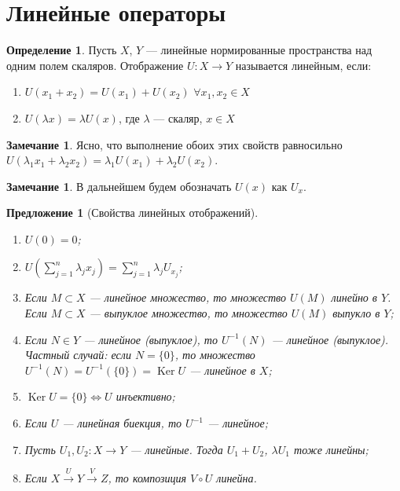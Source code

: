\documentclass[11pt,openany,a4paper]{scrartcl}
\theoremstyle{plain}
\newtheorem{proposition}[theorem]{Предложение}
\theoremstyle{definition}
\newtheorem{definition}[theorem]{Определение}
\newtheorem{remark}[theorem]{Замечание}
\newcommand{\overto}[1]{\xrightarrow{#1}}
\DeclareMathOperator{\Ker}{Ker}
\begin{document}
\section{Линейные операторы}
\begin{definition}
    Пусть $X$, $Y$ — линейные нормированные пространства над одним полем скаляров.
    Отображение $U: X \to Y$ называется линейным, если:
    \begin{enumerate}
        \item $U(x_1+x_2) = U(x_1) + U(x_2)$ $\forall x_1, x_2 \in X$
        \item $U(\lambda x) = \lambda U(x)$, где $\lambda$ — скаляр, $x \in X$
    \end{enumerate}
\end{definition}
\begin{remark}
    Ясно, что выполнение обоих этих свойств равносильно
    $U(\lambda_1x_1 + \lambda_2x_2) = \lambda_1U(x_1) + \lambda_2U(x_2)$.
\end{remark}
\begin{remark}
    В дальнейшем будем обозначать $U(x)$ как $U_x$.
\end{remark}
\begin{proposition}[Свойства линейных отображений]
\mbox{}
    \begin{enumerate}
        \item $U(0) = 0$;
        \item $U(\sum\limits_{j=1}^n \lambda_j x_j) = \sum\limits_{j=1}^n
        \lambda_j U_{x_j}$;
        \item\label{image_linearity} Если $M \subset X$ — линейное множество,
        то множество
        $U(M)$ линейно в $Y$. Если $M \subset X$ — выпуклое множество,
        то множество $U(M)$ выпукло в $Y$;
        \item\label{preimage_linearity} Если $N \in Y$ — линейное (выпуклое),
        то $U^{-1}(N)$ — линейное (выпуклое). Частный случай: если $N = \{0\}$, то множество
        $U^{-1}(N) = U^{-1}(\{0\}) = \Ker U$ — линейное в $X$;
        \item $\Ker U = \{0\} \iff U$ инъективно;
        \item\label{inverse_linearity} Если $U$ — линейная биекция, то
        $U^{-1}$ — линейное;
        \item Пусть $U_1, U_2: X \to Y$ — линейные. Тогда $U_1 + U_2$,
        $\lambda U_1$ тоже линейны;
        \item Если $X \overto{U} Y \overto{V} Z$, то композиция $V\circ U$
        линейна.
    \end{enumerate}
\end{proposition}
\end{document}
